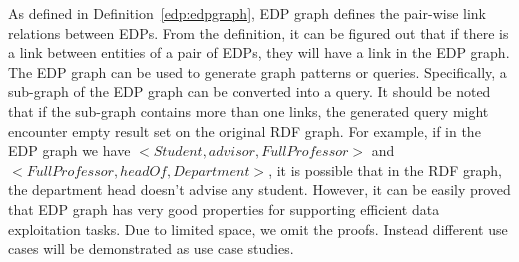 As defined in Definition~\ref{edp:edpgraph}, EDP graph defines the pair-wise link relations between EDPs. From the definition, it can be figured out that if there is a link between entities of a pair of EDPs, they will have a link in the EDP graph. The EDP graph can be used to generate graph patterns or queries. Specifically, a sub-graph of the EDP graph can be converted into a query. It should be noted that if the sub-graph contains more than one links, the generated query might encounter empty result set on the original RDF graph. For example, if in the EDP graph we have $<Student,advisor,FullProfessor>$ and $<FullProfessor,headOf,Department>$, it is possible that in the RDF graph, the department head doesn’t advise any student. However, it can be easily proved that EDP graph has very good properties for supporting efficient data exploitation tasks. Due to limited space, we omit the proofs. Instead different use cases will be demonstrated  as use case studies.
